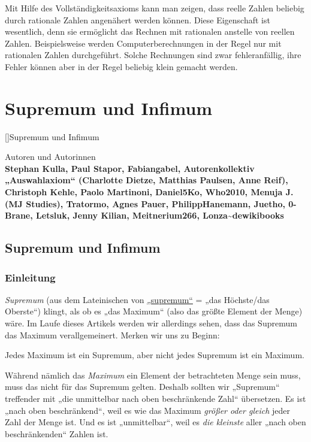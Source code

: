 \documentclass[fontsize=9pt,
               parskip=half-,
               DIV=14,
               listof=chapterentry,
               tocflat]{scrbook}
\newenvironment{authors}{\par\vspace*{\fill}\color{white}Autoren und
Autorinnen\\\bfseries}{\clearpage}
\begin{document}
Mit Hilfe des Vollständigkeitsaxioms kann man zeigen, dass reelle Zahlen beliebig durch rationale Zahlen angenähert werden können. Diese Eigenschaft ist wesentlich, denn sie ermöglicht das Rechnen mit rationalen anstelle von reellen Zahlen. Beispielsweise werden Computerberechnungen in der Regel nur mit rationalen Zahlen durchgeführt. Solche Rechnungen sind zwar fehleranfällig, ihre Fehler können aber in der Regel beliebig klein gemacht werden.

\part{Supremum und Infimum}

[]{Supremum und Infimum}\begin{authors}
Stephan Kulla, Paul Stapor, Fabiangabel, Autorenkollektiv „Auswahlaxiom“ (Charlotte Dietze, Matthias Paulsen, Anne Reif), Christoph Kehle, Paolo Martinoni, Daniel5Ko, Who2010, Menuja J. (MJ Studies), Tratormo, Agnes Pauer, PhilippHanemann, Juetho, 0-Brane, Letsluk, Jenny Kilian, Meitnerium266, Lonza\textasciitilde{}dewikibooks\end{authors}

\chapter{Supremum und Infimum}

\section{Einleitung}

\emph{Supremum} (aus dem Lateinischen von \href{https://de.wiktionary.org/wiki/supremum}
{„supremum“} = „das Höchste/das Oberste“) klingt, als ob es „das Maximum“ (also das größte Element der Menge) wäre. Im Laufe dieses Artikels werden wir allerdings sehen, dass das Supremum das Maximum verallgemeinert. Merken wir uns zu Beginn:

\begin{importantparagraph*}
Jedes Maximum ist ein Supremum, aber nicht jedes Supremum ist ein Maximum.

\end{importantparagraph*}

Während nämlich das \emph{Maximum} ein Element der betrachteten Menge sein muss, muss das nicht für das Supremum gelten. Deshalb sollten wir „Supremum“ treffender mit „die unmittelbar nach oben beschränkende Zahl“ übersetzen. Es ist „nach oben beschränkend“, weil es wie das Maximum \emph{größer oder gleich} jeder Zahl der Menge ist. Und es ist „unmittelbar“, weil es \emph{die kleinste} aller „nach oben beschränkenden“ Zahlen ist.
\end{document}
